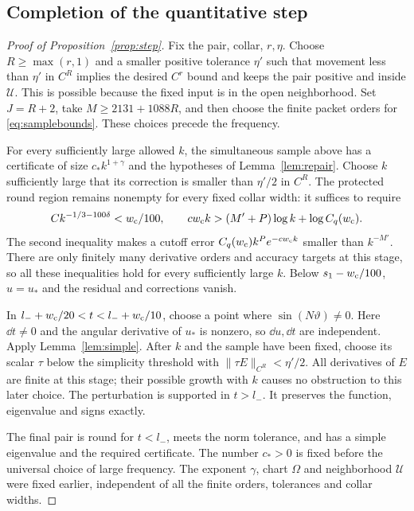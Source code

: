 \subsection{Completion of the quantitative step}

\begin{proof}[Proof of Proposition~\ref{prop:step}]
Fix the pair, collar, \(r,\eta\). Choose \(R\ge\max(r,1)\) and
a smaller positive tolerance \(\eta'\) such that movement
less than \(\eta'\) in \(C^R\) implies the desired \(C^r\)
bound and keeps the pair positive and inside \(\mathcal U\).
This is possible because the fixed input is in the open neighborhood.
Set \(J=R+2\), take \(M\ge2131+1088R\), and then choose the
finite packet orders for \eqref{eq:samplebounds}.
These choices precede the frequency.

For every sufficiently large allowed \(k\), the simultaneous
sample above has a certificate of size \(c_*k^{1+\gamma}\)
and the hypotheses of Lemma~\ref{lem:repair}.
Choose \(k\) sufficiently large that its correction is smaller
than \(\eta'/2\) in \(C^R\).
The protected round region remains nonempty for every fixed
collar width: it suffices to require
\begin{equation}\label{eq:collarthreshold}
 Ck^{-1/3-100\delta}<w_{\rm c}/100,\qquad
 c w_{\rm c}k>(M'+P)\log k+\log C_q(w_{\rm c}).
\end{equation}
The second inequality makes a cutoff error
\(C_q(w_{\rm c})k^P e^{-c w_{\rm c}k}\) smaller than
\(k^{-M'}\). There are only finitely many derivative orders
and accuracy targets at this stage, so all these inequalities
hold for every sufficiently large \(k\).
Below \(s_1-w_{\rm c}/100\), \(u=u_*\) and the residual and
corrections vanish.

In \(l_-+w_{\rm c}/20<t<l_-+w_{\rm c}/10\), choose a point
where \(\sin(N\vartheta)\ne0\). Here \(\dd t\ne0\) and
the angular derivative of \(u_*\) is nonzero, so \(\dd u,\dd t\)
are independent. Apply Lemma~\ref{lem:simple}. After \(k\)
and the sample have been fixed, choose its scalar \(\tau\)
below the simplicity threshold with
\(\|\tau E\|_{C^R}<\eta'/2\).
All derivatives of \(E\) are finite at this stage; their possible
growth with \(k\) causes no obstruction to this later choice.
The perturbation is supported in \(t>l_-\).
It preserves the function, eigenvalue and signs exactly.

The final pair is round for \(t<l_-\), meets the norm tolerance,
and has a simple eigenvalue and the required certificate.
The number \(c_*>0\) is fixed before the universal choice of
large frequency. The exponent \(\gamma\), chart \(\Omega\)
and neighborhood \(\mathcal U\) were fixed earlier, independent
of all the finite orders, tolerances and collar widths.
\end{proof}
